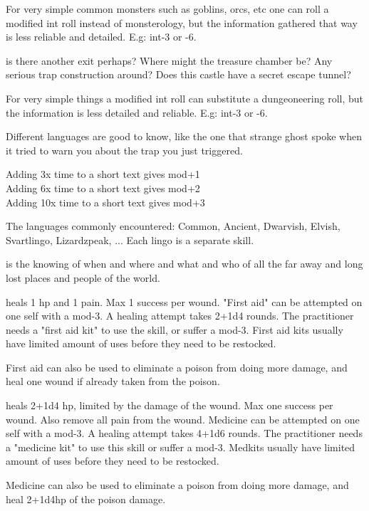 For very simple common monsters such as goblins, orcs, etc one can roll a modified int roll instead of monsterology, but the information gathered that way is less reliable and detailed. E.g: int-3 or -6.


 is there another exit perhaps? Where might the treasure chamber be? Any serious trap construction around? Does this castle have a secret escape tunnel?

For very simple things a modified int roll can substitute a dungeoneering roll, but the information is less detailed and reliable. E.g: int-3 or -6.


 Different languages are good to know, like the one that strange ghost spoke when it tried to warn you about the trap you just triggered.

Adding 3x time to a short text gives mod+1 \\
Adding 6x time to a short text gives mod+2 \\
Adding 10x time to a short text gives mod+3

The languages commonly encountered: Common, Ancient, Dwarvish, Elvish, Svartlingo, Lizardzpeak, ...  Each lingo is a separate skill.


 is the knowing of when and where and what and who of all the far away and long lost places and people of the world.


 heals 1 hp and 1 pain. Max 1 success per wound. "First aid" can be attempted on one self with a mod-3. A healing attempt takes 2+1d4 rounds. The practitioner needs a "first aid kit" to use the skill, or suffer a mod-3. First aid kits usually have limited amount of uses before they need to be restocked.

First aid can also be used to eliminate a poison from doing more damage, and heal one wound if already taken from the poison.


 heals 2+1d4 hp, limited by the damage of the wound. Max one success per wound. Also remove all pain from the wound. Medicine can be attempted on one self with a mod-3. A healing attempt takes 4+1d6 rounds. The practitioner needs a "medicine kit" to use this skill or suffer a mod-3. Medkits usually have limited amount of uses before they need to be restocked.

Medicine can also be used to eliminate a poison from doing more damage, and heal 2+1d4hp of the poison damage.

